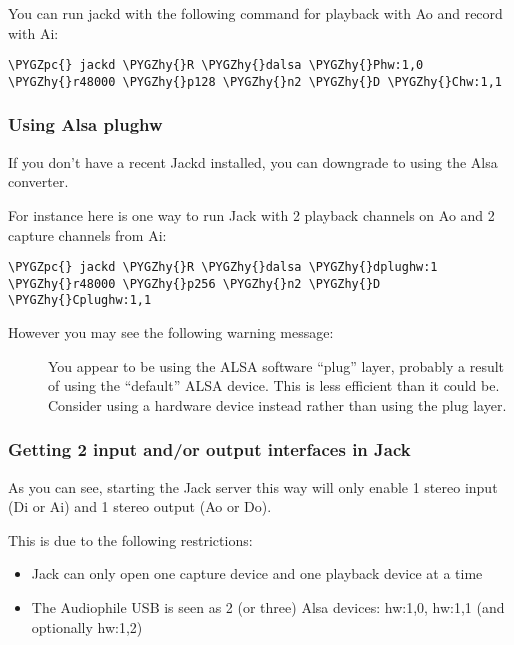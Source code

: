 \documentclass[a4paper,8pt,english]{sphinxmanual}
\def\PYGZpc{\char`\%}
\def\PYGZhy{\char`\-}
\begin{document}
You can run jackd with the following command for playback with Ao and
record with Ai:

\begin{Verbatim}[commandchars=\\\{\}]
\PYGZpc{} jackd \PYGZhy{}R \PYGZhy{}dalsa \PYGZhy{}Phw:1,0 \PYGZhy{}r48000 \PYGZhy{}p128 \PYGZhy{}n2 \PYGZhy{}D \PYGZhy{}Chw:1,1
\end{Verbatim}


\subsubsection{Using Alsa plughw}
\label{sound/cards/audiophile-usb:using-alsa-plughw}
If you don't have a recent Jackd installed, you can downgrade to using
the Alsa  converter.

For instance here is one way to run Jack with 2 playback channels on Ao and 2
capture channels from Ai:

\begin{Verbatim}[commandchars=\\\{\}]
\PYGZpc{} jackd \PYGZhy{}R \PYGZhy{}dalsa \PYGZhy{}dplughw:1 \PYGZhy{}r48000 \PYGZhy{}p256 \PYGZhy{}n2 \PYGZhy{}D \PYGZhy{}Cplughw:1,1
\end{Verbatim}
\begin{description}
\item[{However you may see the following warning message:}] \leavevmode
You appear to be using the ALSA software ``plug'' layer, probably a result of
using the ``default'' ALSA device. This is less efficient than it could be.
Consider using a hardware device instead rather than using the plug layer.

\end{description}


\subsubsection{Getting 2 input and/or output interfaces in Jack}
\label{sound/cards/audiophile-usb:getting-2-input-and-or-output-interfaces-in-jack}
As you can see, starting the Jack server this way will only enable 1 stereo
input (Di or Ai) and 1 stereo output (Ao or Do).

This is due to the following restrictions:
\begin{itemize}
\item {} 
Jack can only open one capture device and one playback device at a time

\item {} 
The Audiophile USB is seen as 2 (or three) Alsa devices: hw:1,0, hw:1,1
(and optionally hw:1,2)

\end{itemize}
\end{document}
